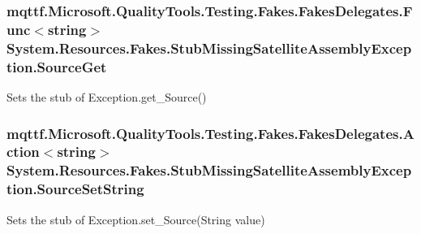 \hypertarget{class_system_1_1_resources_1_1_fakes_1_1_stub_missing_satellite_assembly_exception_a532074cad376586241870eaa5aa69ebc}{
\subsubsection[{Source\-Get}]{\setlength{\rightskip}{0pt plus 5cm}mqttf.\-Microsoft.\-Quality\-Tools.\-Testing.\-Fakes.\-Fakes\-Delegates.\-Func$<$string$>$ System.\-Resources.\-Fakes.\-Stub\-Missing\-Satellite\-Assembly\-Exception.\-Source\-Get}}\label{class_system_1_1_resources_1_1_fakes_1_1_stub_missing_satellite_assembly_exception_a532074cad376586241870eaa5aa69ebc}


Sets the stub of Exception.\-get\-\_\-\-Source()

\hypertarget{class_system_1_1_resources_1_1_fakes_1_1_stub_missing_satellite_assembly_exception_acbbe49154cc2c1eeba1f14e6817cff7a}{
\subsubsection[{Source\-Set\-String}]{\setlength{\rightskip}{0pt plus 5cm}mqttf.\-Microsoft.\-Quality\-Tools.\-Testing.\-Fakes.\-Fakes\-Delegates.\-Action$<$string$>$ System.\-Resources.\-Fakes.\-Stub\-Missing\-Satellite\-Assembly\-Exception.\-Source\-Set\-String}}\label{class_system_1_1_resources_1_1_fakes_1_1_stub_missing_satellite_assembly_exception_acbbe49154cc2c1eeba1f14e6817cff7a}


Sets the stub of Exception.\-set\-\_\-\-Source(\-String value)


